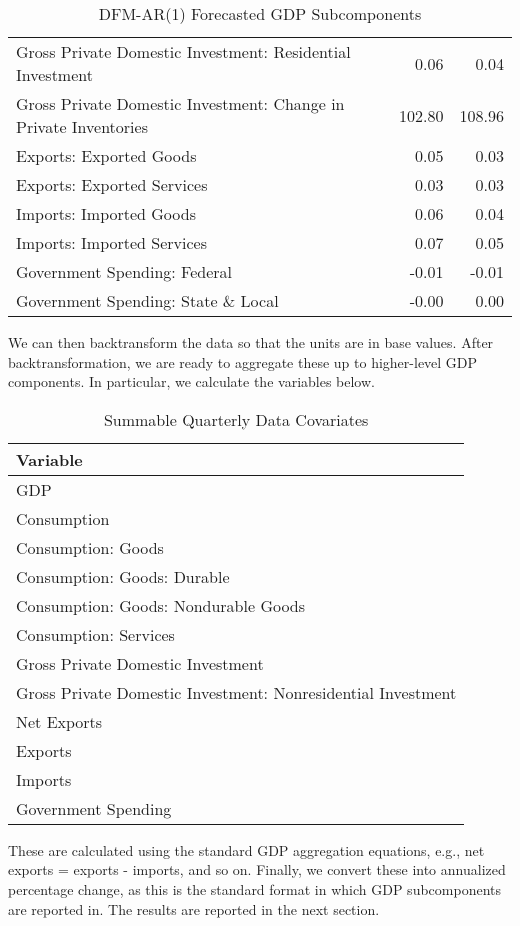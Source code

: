\documentclass[11pt, letterpaper]{article}\usepackage[]{graphicx}\usepackage[]{color}
\begin{document}
\begin{table}[H]
\begin{tabular}{lrr}
  Gross Private Domestic Investment: Residential Investment & 0.06 & 0.04 \\ 
  Gross Private Domestic Investment: Change in Private Inventories & 102.80 & 108.96 \\ 
  Exports: Exported Goods & 0.05 & 0.03 \\ 
  Exports: Exported Services & 0.03 & 0.03 \\ 
  Imports: Imported Goods & 0.06 & 0.04 \\ 
  Imports: Imported Services & 0.07 & 0.05 \\ 
  Government Spending: Federal & -0.01 & -0.01 \\ 
  Government Spending: State \& Local & -0.00 & 0.00 \\ 
   \hline
\end{tabular}
\endgroup
\caption{DFM-AR(1) Forecasted GDP Subcomponents} 
\end{table}


We can then backtransform the data so that the units are in base values. After backtransformation, we are ready to aggregate these up to higher-level GDP components. In particular, we calculate the variables below.
\begin{table}[H]
\centering
\begingroup\scriptsize
\begin{tabular}{l}
  \hline
Variable \\ 
  \hline
GDP \\ 
  Consumption \\ 
  Consumption: Goods \\ 
  Consumption: Goods: Durable \\ 
  Consumption: Goods: Nondurable Goods \\ 
  Consumption: Services \\ 
  Gross Private Domestic Investment \\ 
  Gross Private Domestic Investment: Nonresidential Investment \\ 
  Net Exports \\ 
  Exports \\ 
  Imports \\ 
  Government Spending \\ 
   \hline
\end{tabular}
\endgroup
\caption{Summable Quarterly Data Covariates} 
\end{table}

These are calculated using the standard GDP aggregation equations, e.g., net exports = exports - imports, and so on.
Finally, we convert these into annualized percentage change, as this is the standard format in which GDP subcomponents are reported in. The results are reported in the next section.
\end{document}

